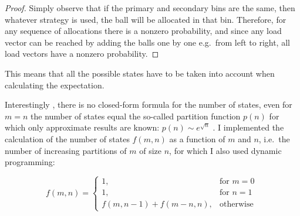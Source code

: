 \begin{proof}
    Simply observe that if the primary and secondary bins are the same, then whatever strategy is used, the ball will be allocated in that bin. Therefore, for any sequence of allocations there is a nonzero probability, and since any load vector can be reached by adding the balls one by one e.g.\ from left to right, all load vectors have a nonzero probability. 
\end{proof}

This means that all the possible states have to be taken into account when calculating the expectation.



Interestingly , there is no closed-form formula for the number of states, even for $m=n$ the number of states equal the so-called partition function $p(n)$ for which only approximate results are known: $p(n) \sim e^{\sqrt{n}}$ \cite{hardy1918partitionfunction}. I implemented the calculation of the number of states $f(m, n)$ as a function of $m$ and $n$, i.e.\ the number of increasing partitions of $m$ of size $n$, for which I also used dynamic programming:

\begin{equation} \label{eq: numberofpartitions}
    f(m, n) = \begin{cases}
        1, & \text{for } m=0\\
        1, & \text{for } n=1\\
        f(m,n-1)+f(m-n,n), & \text{otherwise }
    \end{cases}
\end{equation}




